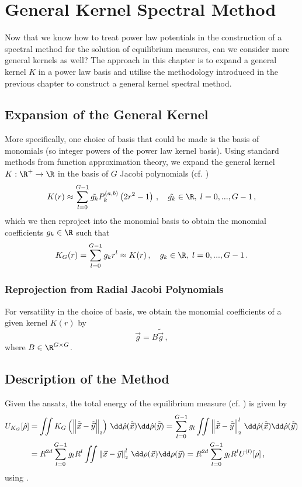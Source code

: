 \chapter{General Kernel Spectral Method}
\label{chap:general-kernel-spectral-method}

Now that we know how to treat power law potentials in the construction of a spectral method for the solution of equilibrium measures, can we consider more general kernels as well?
The approach in this chapter is to expand a general kernel $K$ in a power law basis and utilise the methodology introduced in the previous chapter to construct a general kernel spectral method.

\section{Expansion of the General Kernel}
More specifically, one choice of basis that could be made is the basis of monomials (so integer powers of the power law kernel basis).
Using standard methods from function approximation theory, we expand the general kernel $K: \R^+ \to \R$ in the basis of $G$ Jacobi polynomials (cf. )
$$K(r) \approx \sum_{l=0}^{G-1} \tilde{g_k} P_k^{(a, b)}\left(2 r^2 - 1\right)\,, \quad \tilde{g_k} \in \R, \;l = 0, ..., G-1\,,$$
which we then reproject into the monomial basis to obtain the monomial coefficients $g_k \in \R$ such that
\begin{equation}
  K_G(r) = \sum_{l=0}^{G-1} g_k r^l \approx K(r)\,,\quad g_k \in \R, \;l=0, ..., G-1\,.
  \label{eq:monomial-expansion}
\end{equation}

\subsection{Reprojection from Radial Jacobi Polynomials}
For versatility in the choice of basis, we obtain the monomial coefficients of a given kernel $K(r)$ by
$$\vec{g} = B \tilde{\vec{g}}\,,$$
where $B \in \R^{G \times G}$.


\section{Description of the Method}
Given the ansatz, the total energy of the equilibrium measure (cf. ) is given by
\begin{align*}
  U_{K_G}[\hat{\rho}] & = \iint K_G\left(\norm{\hatvec{x}-\hatvec{y}}\right) \,\dd\hat{\rho}(\hatvec{x})\dd\hat{\rho}(\hatvec{y})
  = \sum_{l=0}^{G-1} g_l \iint \norm{\hatvec{x}-\hatvec{y}}^l \,\dd\hat{\rho}(\hatvec{x})\dd\hat{\rho}(\hatvec{y})                \\
                      & = R^{2d} \sum_{l=0}^{G-1} g_l R^l \iint \norm{\vec{x}-\vec{y}}^l \,\dd\rho(\vec{x})\dd\rho(\vec{y})
  = R^{2d} \sum_{l=0}^{G-1} g_l R^l U^{(l)}[\rho]\,,
\end{align*}
using .

